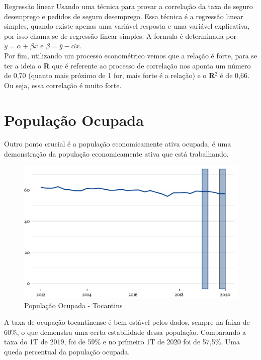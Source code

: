 \begin{smbox}[label={labelbox},nameref={Desigualdade por gênero}]{Regressão linear}
	Usando uma técnica para provar a correlação da taxa de seguro desemprego e pedidos de seguro desemprego. Essa técnica é a regressão linear simples, quando existe apenas uma variável resposta e uma variável explicativa, por isso chama-se de regressão linear simples. A formula é determinada por $y = \alpha + \beta x$ e $\beta = \overline{y} - \overline{\alpha x}$.
	\\
	Por fim, utilizando um processo econométrico vemos que a relação é forte, para se ter a ideia o \textbf{R} que é referente ao processo de correlação nos aponta um número de 0,70 (quanto mais próximo de 1 for, mais forte é a relação) e o \textbf{R}$^{2}$ é de 0,66. Ou seja, essa correlação é muito forte. 
\end{smbox}

\section{População Ocupada}

\par Outro ponto crucial é a população economicamente ativa ocupada, é uma demonstração da população economicamente ativa que está trabalhando.

\begin{figure}[h]
	\caption{População Ocupada - Tocantins}
	\includegraphics[width=\linewidth]{fig/População Ocupada.pdf}
\end{figure}

\par  A taxa de ocupação tocantinense é bem estável pelos dados, sempre na faixa de 60\%, o que demonstra uma certa estabilidade dessa população. Comparando a taxa do 1T de 2019, foi de 59\% e no prímeiro 1T de 2020 foi de 57,5\%. Uma queda percentual da população ocupada.

